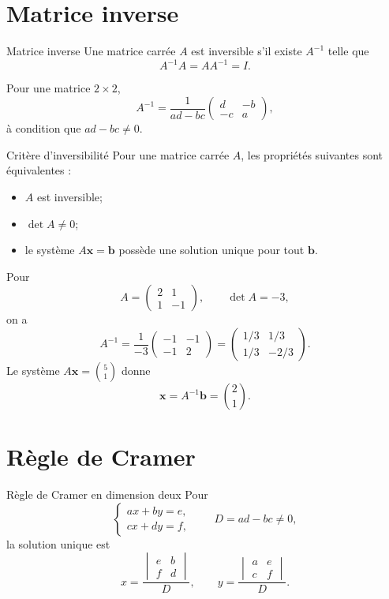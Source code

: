 \documentclass[12pt,a4paper,openany]{book}
\begin{document}
\section{Matrice inverse}

\begin{definition}{Matrice inverse}{}
Une matrice carrée $A$ est inversible s'il existe $A^{-1}$ telle que
\[
A^{-1}A=AA^{-1}=I.
\]
\end{definition}

Pour une matrice $2\times2$,
\[
A^{-1}=\frac1{ad-bc}
\begin{pmatrix}d&-b\\-c&a\end{pmatrix},
\]
à condition que $ad-bc\neq0$.

\begin{theorem}{Critère d'inversibilité}{}
Pour une matrice carrée $A$, les propriétés suivantes sont équivalentes :
\begin{itemize}
\item $A$ est inversible;
\item $\det A\neq0$;
\item le système $A\mathbf x=\mathbf b$ possède une solution unique pour tout $\mathbf b$.
\end{itemize}
\end{theorem}

\begin{examplebox}
Pour
\[
A=\begin{pmatrix}2&1\\1&-1\end{pmatrix},
\qquad \det A=-3,
\]
on a
\[
A^{-1}=\frac1{-3}\begin{pmatrix}-1&-1\\-1&2\end{pmatrix}
=\begin{pmatrix}1/3&1/3\\1/3&-2/3\end{pmatrix}.
\]
Le système $A\mathbf x=\binom51$ donne
\[
\mathbf x=A^{-1}\mathbf b=\binom21.
\]
\end{examplebox}

\section{Règle de Cramer}

\begin{theorem}{Règle de Cramer en dimension deux}{}
Pour
\[
\begin{cases}
ax+by=e,\\
cx+dy=f,
\end{cases}
\qquad D=ad-bc\neq0,
\]
la solution unique est
\[
x=\frac{\begin{vmatrix}e&b\\f&d\end{vmatrix}}{D},
\qquad
y=\frac{\begin{vmatrix}a&e\\c&f\end{vmatrix}}{D}.
\]
\end{theorem}
\end{document}
